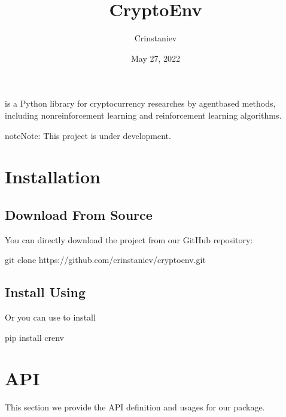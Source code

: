 \documentclass[letterpaper,10pt,english]{sphinxmanual}
\title{CryptoEnv}
\date{May 27, 2022}
\author{Crinstaniev}
\begin{document}
\pagestyle{empty}
\sphinxmaketitle
\pagestyle{plain}
\sphinxtableofcontents
\pagestyle{normal}
\label{\detokenize{index::doc}}


\sphinxAtStartPar
{} is a Python library for cryptocurrency researches by agent\sphinxhyphen{}based methods, including non\sphinxhyphen{}reinforcement learning and reinforcement learning algorithms.

\begin{sphinxadmonition}{note}{Note:}
\sphinxAtStartPar
This project is under development.
\end{sphinxadmonition}


\chapter{Installation}
\label{\detokenize{installation:installation}}\label{\detokenize{installation::doc}}

\section{Download From Source}
\label{\detokenize{installation:download-from-source}}
\sphinxAtStartPar
You can directly download the project from our GitHub repository:

\begin{sphinxVerbatim}[commandchars=\\\{\}]
git clone https://github.com/crinstaniev/cryptoenv.git
\end{sphinxVerbatim}


\section{Install Using }
\label{\detokenize{installation:install-using-pip}}
\sphinxAtStartPar
Or you can use  to install

\begin{sphinxVerbatim}[commandchars=\\\{\}]
pip install crenv
\end{sphinxVerbatim}


\chapter{API}
\label{\detokenize{api:api}}\label{\detokenize{api::doc}}
\sphinxAtStartPar
This section we provide the API definition and usages for our  package.
\end{document}
